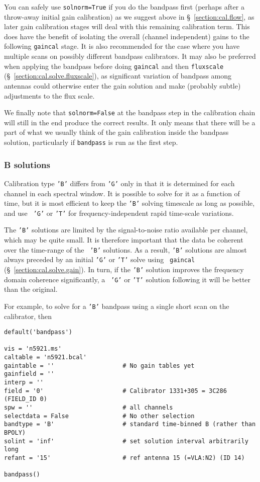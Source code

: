 You can safely use {\tt solnorm=True} if you do the bandpass first
(perhaps after a throw-away initial gain calibration) as we suggest above in
\S~\ref{section:cal.flow}, as later gain calibration stages will deal with this
remaining calibration term.  This does have the benefit of isolating
the overall (channel independent) gains to the following {\tt gaincal}
stage.  It is also recommended for the case where you have multiple
scans on possibly different bandpass calibrators.  It may also be 
preferred when applying the bandpass before doing {\tt gaincal} and 
then {\tt fluxscale} (\S~\ref{section:cal.solve.fluxscale}), 
as significant variation of bandpass among antennas could otherwise 
enter the gain solution and make (probably subtle) adjustments to the
flux scale.

We finally note that {\tt solnorm=False} at the bandpass step in the
calibration chain will still in the end produce the correct results.  It
only means that there will be a part of what we usually think of the
gain calibration inside the bandpass solution, particularly if
{\tt bandpass} is run as the first step.

\subsubsection{B solutions}
\label{section:cal.solve.band.b}

Calibration type {\tt 'B'} differs from {\tt 'G'} only in that it is
determined for each channel in each spectral window.  It is possible
to solve for it as a function of time, but it is most efficient to
keep the {\tt 'B'} solving timescale as long as possible, and use {\tt
'G'} or {\tt 'T'} for frequency-independent rapid  time-scale variations.

The {\tt 'B'} solutions are limited by the signal-to-noise ratio
available per channel, which may be quite small.  It is therefore
important that the data be coherent over the time-range of the {\tt
'B'} solutions.  As a result, {\tt 'B'} solutions are almost always
preceded by an initial {\tt 'G'} or {\tt 'T'} solve using {\tt
gaincal} (\S~\ref{section:cal.solve.gain}).  In turn, if the {\tt 'B'}
solution improves the frequency domain coherence significantly, a {\tt
'G'} or {\tt 'T'} solution following it will be better than the
original.

For example, to solve for a {\tt 'B'} bandpass using a single short
scan on the calibrator, then
\small
\begin{verbatim}
default('bandpass')

vis = 'n5921.ms'
caltable = 'n5921.bcal'
gaintable = ''                   # No gain tables yet
gainfield = ''
interp = ''
field = '0'                      # Calibrator 1331+305 = 3C286 (FIELD_ID 0)
spw = ''                         # all channels
selectdata = False               # No other selection
bandtype = 'B'                   # standard time-binned B (rather than BPOLY)
solint = 'inf'                   # set solution interval arbitrarily long
refant = '15'                    # ref antenna 15 (=VLA:N2) (ID 14)

bandpass()
\end{verbatim}
\normalsize

